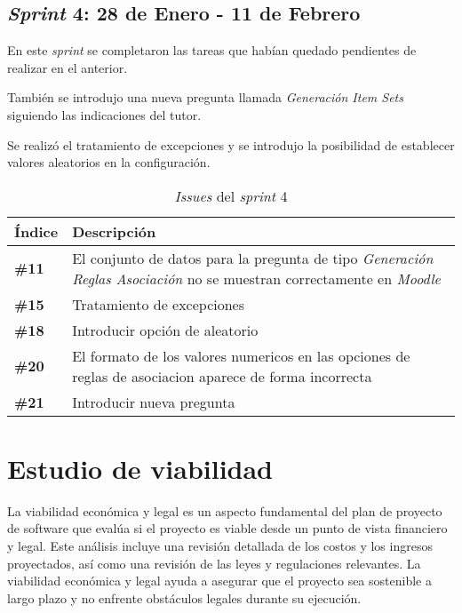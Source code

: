\subsection{\textit{Sprint} 4: 28 de Enero - 11 de Febrero}

En este \textit{sprint} se completaron las tareas que habían quedado pendientes de realizar en el anterior. 

También se introdujo una nueva pregunta llamada \textit{Generación Item Sets} siguiendo las indicaciones del tutor.

Se realizó el tratamiento de excepciones y se introdujo la posibilidad de establecer valores aleatorios en la configuración.

\begin{table}[h]
	\centering
	\begin{tabularx}{\linewidth}{X p{}}
		\toprule
		\textbf{Índice} & \textbf{Descripción} \\
		\toprule
		\textbf{\#11} & El conjunto de datos para la pregunta de tipo \textit{Generación Reglas Asociación} no se muestran correctamente en \textit{Moodle} \\
		\textbf{\#15} & Tratamiento de excepciones \\
		\textbf{\#18} & Introducir opción de aleatorio \\
		\textbf{\#20} & El formato de los valores numericos en las opciones de reglas de asociacion aparece de forma incorrecta \\
  	\textbf{\#21} & Introducir nueva pregunta \\
		\bottomrule
	\end{tabularx}
	\caption{\textit{Issues} del \textit{sprint} 4}
\end{table}


\section{Estudio de viabilidad}

La viabilidad económica y legal es un aspecto fundamental del plan de proyecto de software que evalúa si el proyecto es viable desde un punto de vista financiero y legal. Este análisis incluye una revisión detallada de los costos y los ingresos proyectados, así como una revisión de las leyes y regulaciones relevantes. La viabilidad económica y legal ayuda a asegurar que el proyecto sea sostenible a largo plazo y no enfrente obstáculos legales durante su ejecución.

